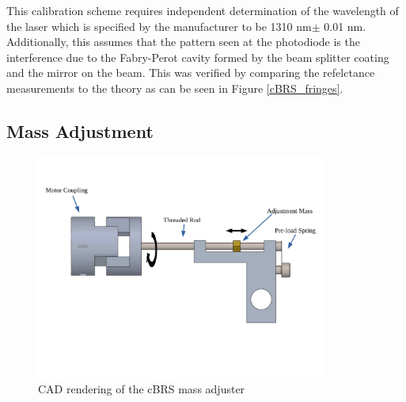 \documentclass [12pt, proquest]{uwthesis}[2019]
\begin{document}
This calibration scheme requires independent determination of the wavelength of the laser which is specified by the manufacturer to be 1310 nm$\pm$ 0.01 nm. Additionally, this assumes that the pattern seen at the photodiode is the interference due to the Fabry-Perot cavity formed by the beam splitter coating and the mirror on the beam. This was verified by comparing the refelctance measurements to the theory as can be seen in Figure \ref{cBRS_fringes}.


\subsection{Mass Adjustment}

\begin{figure}[!h]
\begin{center}
\includegraphics[width=0.85\textwidth]{cBRSMassAdjusterLabeled.pdf}
\end{center}
\caption[CAD rendering of the cBRS mass adjuster]{CAD rendering of the cBRS mass adjuster}\label{massAdjust}
\end{figure}
\end{document}
